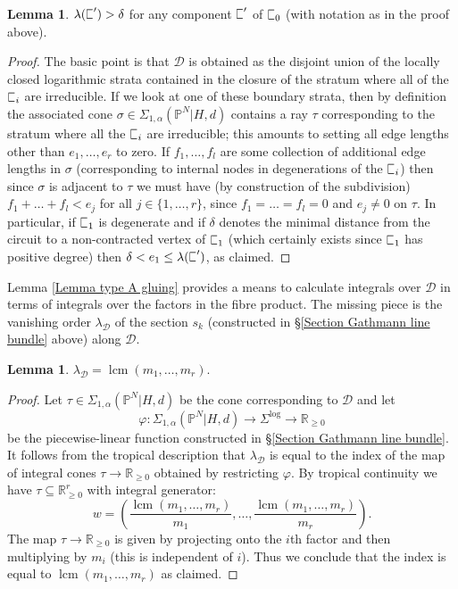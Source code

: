 \documentclass[11pt]{amsart}
\newcommand{\lcm}{\operatorname{lcm}}
\newcommand{\sqC}{\scalebox{0.8}[1.3]{$\sqsubset$}}
\newcommand{\PP}{\mathbb P}
\renewcommand{\to}{\rightarrow}
\newcommand{\Dcal}{\mathcal{D}}
\newcommand{\RR}{\mathbb{R}}
\theoremstyle{definition}
\newtheorem{lemma}[thm]{Lemma}
\theoremstyle{definition}
\begin{document}
\begin{lemma}\label{type A radius lemma} $\lambda(\sqC^\prime) > \delta$ for any component $\sqC^\prime$ of $\sqC_0$ (with notation as in the proof above).\end{lemma}
\begin{proof} The basic point is that $\Dcal$ is obtained as the disjoint union of the locally closed logarithmic strata contained in the closure of the stratum where all of the $\sqC_i$ are irreducible. If we look at one of these boundary strata, then by definition the associated cone $\sigma \in \Sigma_{1,\alpha}(\PP^N|H,d)$ contains a ray $\tau$ corresponding to the stratum where all the $\sqC_i$ are irreducible; this amounts to setting all edge lengths other than $e_1,\ldots,e_r$ to zero. If $f_1,\ldots,f_l$ are some collection of additional edge lengths in $\sigma$ (corresponding to internal nodes in degenerations of the $\sqC_i$) then since $\sigma$ is adjacent to $\tau$ we must have (by construction of the subdivision) $f_1+\ldots+f_l < e_j$ for all $j\in\{1,\ldots,r\}$, since $f_1=\ldots=f_l=0$ and $e_j \neq 0$ on $\tau$. In particular, if $\sqC_1$ is degenerate and if $\delta$ denotes the minimal distance from the circuit to a non-contracted vertex of $\sqC_1$ (which certainly exists since $\sqC_1$ has positive degree) then $\delta < e_1 \leq \lambda(\sqC^\prime)$, as claimed.\end{proof}

Lemma \ref{Lemma type A gluing} provides a means to calculate integrals over $\Dcal$ in terms of integrals over the factors in the fibre product. The missing piece is the vanishing order $\lambda_\Dcal$ of the section $s_k$ (constructed in \S \ref{Section Gathmann line bundle} above) along $\Dcal$.

\begin{lemma} \label{lemma vanishing order type A} $\lambda_\Dcal = \lcm(m_1,\ldots,m_r).$ \end{lemma}
\begin{proof} Let $\tau \in \Sigma_{1,\alpha}(\PP^N|H,d)$ be the cone corresponding to $\Dcal$ and let
\begin{equation*} \varphi \colon \Sigma_{1,\alpha}(\PP^N|H,d) \to \Sigma^{\log} \to \RR_{\geq 0} \end{equation*}
be the piecewise-linear function constructed in \S \ref{Section Gathmann line bundle}. It follows from the tropical description that $\lambda_\Dcal$ is equal to the index of the map of integral cones $\tau \to \RR_{\geq 0}$ obtained by restricting $\varphi$. By tropical continuity we have $\tau \subseteq \RR_{\geq 0}^r$ with integral generator:
\begin{equation*} w = \left( \dfrac{\lcm(m_1,\ldots,m_r)}{m_1},\ldots,\dfrac{\lcm(m_1,\ldots,m_r)}{m_r} \right).\end{equation*}
The map $\tau \to \RR_{\geq 0}$ is given by projecting onto the $i$th factor and then multiplying by $m_i$ (this is independent of $i$). Thus we conclude that the index is equal to $\lcm(m_1,\ldots,m_r)$ as claimed.\end{proof}
\end{document}
